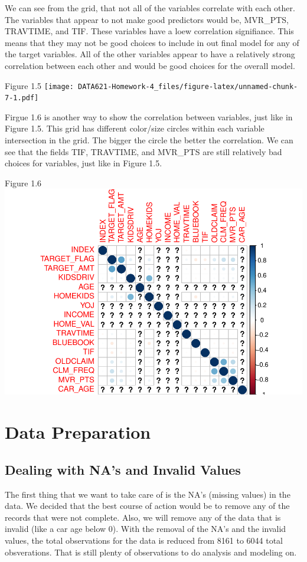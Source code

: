 \documentclass[]{article}
\begin{document}
We can see from the grid, that not all of the variables correlate with
each other. The variables that appear to not make good predictors would
be, MVR\_PTS, TRAVTIME, and TIF. These variables have a loew correlation
signifiance. This means that they may not be good choices to include in
out final model for any of the target variables. All of the other
variables appear to have a relatively strong correlation between each
other and would be good choices for the overall model.

Figure 1.5
\texttt{[image: DATA621-Homework-4\_files/figure-latex/unnamed-chunk-7-1.pdf]}

Firgue 1.6 is another way to show the correlation between variables,
just like in Figure 1.5. This grid has different color/size circles
within each variable intersection in the grid. The bigger the circle the
better the correlation. We can see that the fields TIF, TRAVTIME, and
MVR\_PTS are still relatively bad choices for variables, just like in
Figure 1.5.

Figure 1.6
\includegraphics{DATA621-Homework-4_files/figure-latex/unnamed-chunk-8-1.pdf}

\section{Data Preparation}\label{data-preparation}

\subsection{Dealing with NA's and Invalid
Values}\label{dealing-with-nas-and-invalid-values}

The first thing that we want to take care of is the NA's (missing
values) in the data. We decided that the best course of action would be
to remove any of the records that were not complete. Also, we will
remove any of the data that is invalid (like a car age below 0). With
the removal of the NA's and the invalid values, the total observations
for the data is reduced from 8161 to 6044 total obsverations. That is
still plenty of observations to do analysis and modeling on.
\end{document}
